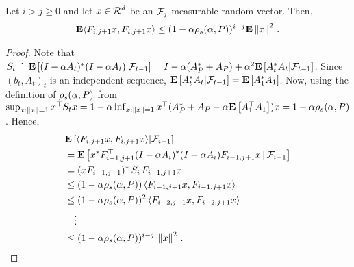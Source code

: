 \begin{lemma}\label{innerproduct}
Let $i>j \ge 0$ and let $x\in \mathcal{R}^d$ be an $\mathcal{F}_j$-measurable random vector.
Then,
\begin{align*}
\mathbf{E}\langle F_{i,j+1}x,F_{i,j+1}x\rangle\leq (1-\alpha \rho_s(\alpha,P))^{i-j}\mathbf{E}\left\| x\right\|^2\,.
\end{align*}
\end{lemma}
\begin{proof}
Note that
$S_t\doteq \mathbf{E}\left[ (I-\alpha A_t)^* (I-\alpha A_t) | \mathcal{F}_{t-1} \right]
= I - \alpha (A_P^* + A_P) + \alpha^2 \mathbf{E}\left[ A_t^* A_t | \mathcal{F}_{t-1} \right]$.
Since $(b_t,A_t)_t$ is an independent sequence, $\mathbf{E}\left[ A_t^* A_t|\mathcal{F}_{t-1}\right] = \mathbf{E}\left[ A_1^* A_1 \right]$.
Now, using the definition of $\rho_s(\alpha,P)$ from 
$\sup_{x:\left\| x\right\|= 1} x^\top S_t x = 1 - \alpha \inf_{x:\left\| x\right\|=1} x^\top (A_P^* + A_P - \alpha \mathbf{E}\left[A_1^\top A_1\right]) x
= 1-\alpha \rho_s(\alpha,P)$.
Hence,
\begin{align*}
&\mathbf{E}\left[\langle F_{i,j+1}x,F_{i,j+1}x\rangle|\mathcal{F}_{i-1} \right]\\
&= \mathbf{E}\left[x^* F_{i-1,j+1}^\top (I-\alpha A_i)^* (I-\alpha A_i) F_{i-1,j+1} x\,|\,\mathcal{F}_{i-1}\right]\\
&=(x F_{i-1,j+1})^* \, S_i \, F_{i-1,j+1} x\\
&\le (1-\alpha \rho_s(\alpha,P)) \, \langle F_{i-1,j+1} x, F_{i-1,j+1} x\rangle \\
& \le (1-\alpha \rho_s(\alpha,P))^2\, \langle F_{i-2,j+1} x, F_{i-2,j+1} x\rangle \\
& \quad \vdots \\
& \le (1-\alpha \rho_s(\alpha,P))^{i-j}\, \left\| x\right\|^2\,.
\end{align*}
\end{proof}





